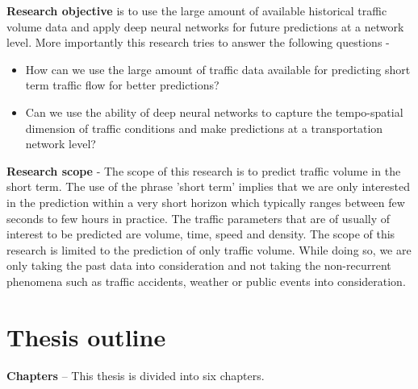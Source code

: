 \textbf{Research objective} is to use the large amount of available historical traffic volume data and
apply deep neural networks for future predictions at a network level. More importantly this research
tries to answer the following questions -

\begin{itemize}
\item How can we use the large amount of traffic data available for predicting short term traffic
 flow for better predictions?
\item Can we use the ability of deep neural networks to capture the tempo-spatial dimension of
traffic conditions and make predictions at a transportation network level?
\end{itemize}

\textbf{Research scope} - The scope of this research is to predict traffic volume in the
short term. The use of the phrase 'short term' implies that we are only interested in the
prediction within a very short horizon which typically ranges between few seconds to few
hours in practice. The traffic parameters that are of usually of interest to be predicted are
volume, time, speed and density. The scope of this research is limited to the prediction of only
traffic volume. While doing so, we are only taking the past data into consideration and not
taking the non-recurrent phenomena such as traffic accidents, weather or public events into
consideration.


\section{Thesis outline}

\textbf{Chapters} -- This thesis is divided into six chapters.

